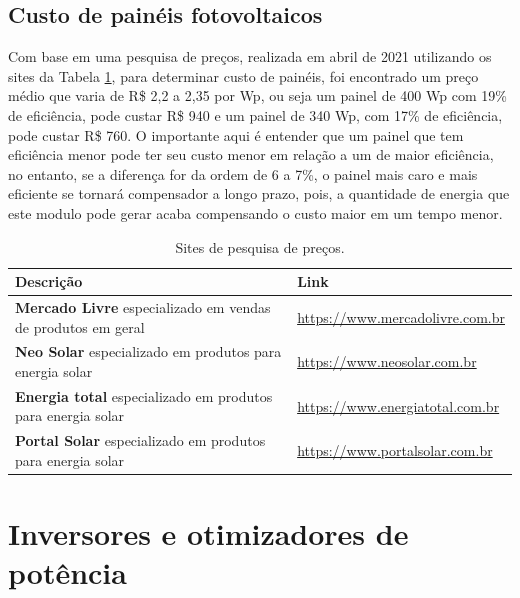 \subsection{Custo de painéis fotovoltaicos}

Com base em uma pesquisa de preços, realizada em abril de 2021 utilizando os sites da Tabela \ref{preco_pv}, para determinar custo de painéis, foi encontrado um preço médio que varia de R\$ 2,2 a 2,35 por Wp, ou seja um painel de 400 Wp com 19\% de eficiência, pode custar R\$ 940 e um painel de 340 Wp, com 17\% de eficiência, pode custar R\$ 760. O importante aqui é entender que um painel que tem eficiência menor pode ter seu custo menor em relação a um de maior eficiência, no entanto, se a diferença for da ordem de 6 a 7\%, o painel mais caro e mais eficiente se tornará compensador a longo prazo, pois, a quantidade de energia que este modulo pode gerar acaba compensando o custo maior em um tempo menor.

\begin{table}[htbp]
    \caption{Sites de pesquisa de preços.}
        \begin{center}
            \begin{tabular}{ >{\centering\arraybackslash} m{5cm} >{\centering\arraybackslash} m{8.5cm} }
                \hline
                Descrição & Link \\ \hline %
                \textbf{Mercado Livre} especializado em vendas de produtos em geral & \url{https://www.mercadolivre.com.br} \\
                \textbf{Neo Solar  } especializado em produtos para energia solar & \url{https://www.neosolar.com.br} \\
                \textbf{Energia total} especializado em produtos para energia solar & \url{https://www.energiatotal.com.br} \\
                \textbf{Portal Solar} especializado em produtos para energia solar & \url{https://www.portalsolar.com.br} \\  \hline
            \end{tabular}
        \end{center}
    \label{preco_pv}
\end{table}

\section{Inversores e otimizadores de potência}

